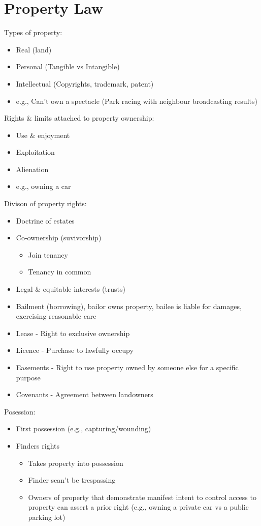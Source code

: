 \documentclass[
  letterpaper,
  landscape,
  columns=3,
  draft,
]{cheatsheet}
\begin{document}
  \section{Property Law}
  Types of property:
  \begin{itemize}
    \item Real (land)
    \item Personal (Tangible vs Intangible)
    \item Intellectual (Copyrights, trademark, patent)
    \item e.g., Can't own a spectacle (Park racing with neighbour broadcasting results)
  \end{itemize}
  Rights \& limits attached to property ownership:
  \begin{itemize}
    \item Use \& enjoyment
    \item Exploitation
    \item Alienation
    \item e.g., owning a car
  \end{itemize}
  Divison of property rights:
  \begin{itemize}
    \item Doctrine of estates
    \item Co-ownership (suvivorship)
          \begin{itemize}
            \item Join tenancy
            \item Tenancy in common
          \end{itemize}
    \item Legal \& equitable interests (trusts)
    \item Bailment (borrowing), bailor owns property, bailee is liable for damages, exercising reasonable care
    \item Lease - Right to exclusive ownership
    \item Licence - Purchase to lawfully occupy
    \item Easements - Right to use property owned by someone else for a specific purpose
    \item Covenants - Agreement between landowners
  \end{itemize}
  Posession:
  \begin{itemize}
    \item First possession (e.g., capturing/wounding)
    \item Finders rights
          \begin{itemize}
            \item Takes property into possession
            \item Finder scan't be trespassing
            \item Owners of property that demonstrate manifest intent to control access to property can assert a prior right (e.g., owning a private car vs a public parking lot)
          \end{itemize}
  \end{itemize}
\end{document}
